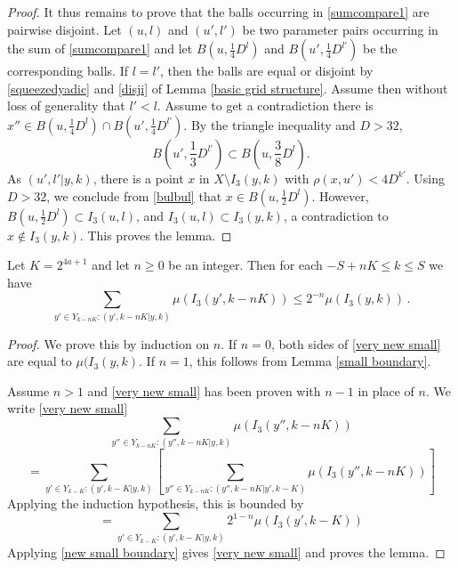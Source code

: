 \begin{proof}
It thus remains to prove that the balls
occurring in
\eqref{sumcompare1} are pairwise disjoint.
Let $(u,l)$ and $(u',l')$ be two parameter pairs occurring
in the sum of \eqref{sumcompare1} and let
$ B(u, \frac 14 D^l)$ and $B({u'}, \frac 14 D^{l'})$
be the corresponding balls. If
$l=l'$, then the balls are equal or disjoint by
\eqref{squeezedyadic} and \eqref{disji} of Lemma \ref{basic grid structure}. Assume then without loss of generality that $l'<l$. Assume to get a contradiction there is $x''\in  B(u, \frac 14 D^l)\cap B({u'}, \frac 14 D^{l'})$.
By the triangle inequality and $D>32$,
\begin{equation}\label{bulbul}
    B(u', \frac 13 D^{l'})\subset B(u, \frac 38 D^l).
\end{equation}
As $(u',l'|y,k)$, there is a point  $x$ in
$X\setminus I_3(y,k)$ with $\rho(x,u')<4D^{k'}$.
Using $D>32$, we conclude from \eqref{bulbul} that
$x\in B(u,\frac 12D^l)$. However, $B(u,\frac 12 D^l)\subset I_3(u,l)$,
and $I_3(u,l)\subset I_3(y,k)$, a contradiction to
$x\not\in I_3(y,k)$.
This proves the lemma.
\end{proof}

\begin{lemma}
\label{smaller boundary}
Let $K = 2^{4a+1}$
and let $n\ge 0$ be an integer. Then
for each $-S+nK\le k\le S$ we have
   \begin{equation}
        \label{very new small}
        \sum_{y'\in Y_{k-nK}: (y',k-nK|y,k)}\mu(I_3(y',k-nK)) \le 2^{-n} \mu(I_3(y,k))\,.
    \end{equation}
\end{lemma}
\begin{proof}
    We prove this by induction on $n$. If $n=0$,
    both sides of \eqref{very new small} are equal to
    $\mu(I_3(y,k)$. If $n=1$, this follows from Lemma \ref{small boundary}.

    Assume $n>1$ and \eqref{very new small} has been proven with  $n-1$ in place of $n$.
We write  \eqref{very new small}
     \begin{equation}
             \sum_{y''\in Y_{k-nK}: (y'',k-nK|y,k)}\mu(I_3(y'',k-nK))
    \end{equation}
     \begin{equation}
=  \sum_{y'\in Y_{k-K}:(y',k-K|y,k)}   \left[   \sum_{y''\in Y_{k-nK}: (y'',k-nK|y',k-K)}\mu(I_3(y'',k-nK)) \right]
    \end{equation}
Applying the induction hypothesis, this is bounded by
         \begin{equation}
=  \sum_{y'\in Y_{k-K}:(y',k-K|y,k)}   2^{1-n}\mu(I_3(y',k-K))
    \end{equation}
Applying \eqref{new small boundary} gives
\eqref{very new small} and proves the lemma.
\end{proof}

